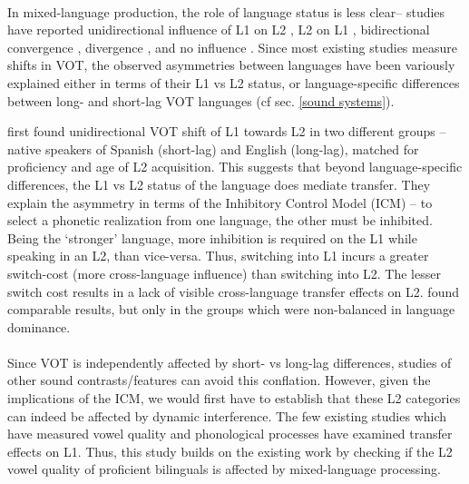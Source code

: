 \documentclass[11pt]{article}
\begin{document}
\paragraph{}In mixed-language production, the role of language status is less clear-- studies have reported unidirectional influence of L1 on L2 \cite{balukas2015spanish,antoniou2011inter,vsimavckova2015immediate,goldrick2014language}, L2 on L1 \cite{tsui2019impact,elias2017effects, olson2013bilingual}, bidirectional convergence \cite{bullock2009trying, olson2016role}, divergence \cite{bullock2009trying,vsimavckova2018patterns}, and no influence \cite{muldner2019phonetics,schwartz2015language}. Since most existing studies measure shifts in VOT, the observed asymmetries between languages have been variously explained either in terms of their L1 vs L2 status, or language-specific differences between long- and short-lag VOT languages (cf sec. \ref{sound systems}).

  first found unidirectional VOT shift of L1 towards L2 in two different groups -- native speakers of Spanish (short-lag) and English (long-lag), matched for proficiency and age of L2 acquisition. This suggests that beyond language-specific differences, the L1 vs L2 status of the language does mediate transfer. They explain the asymmetry in terms of the Inhibitory Control Model (ICM) \cite{green1998mental} -- to select a phonetic realization from one language, the other must be inhibited. Being the `stronger' language, more inhibition is required on the L1 while speaking in an L2, than vice-versa. Thus, switching into L1 incurs a greater switch-cost (more cross-language influence) than switching into L2. The lesser switch cost results in a lack of visible cross-language transfer effects on L2.  found comparable results, but only in the groups which were non-balanced in language dominance.
 
 \paragraph{}Since VOT is independently affected by short- vs long-lag differences, studies of other sound contrasts/features can avoid this conflation. However, given the implications of the ICM, we would first have to establish that these L2 categories can indeed be affected by dynamic interference. The few existing studies which have measured vowel quality \cite{simonet2014phonetic,muldner2019phonetics,elias2017effects} and phonological processes \cite{simonet2020increased,schwartz2015language} have examined transfer effects on L1. Thus, this study builds on the existing work by checking if the L2 vowel quality of proficient bilinguals is affected by mixed-language processing.
\end{document}
